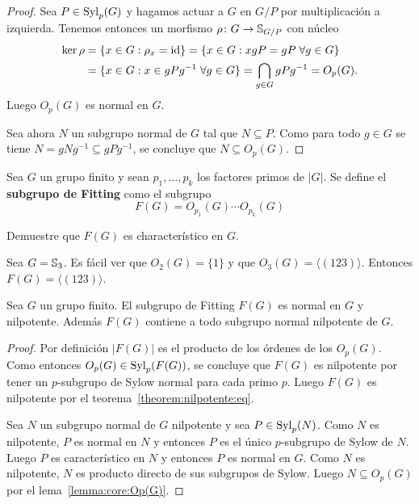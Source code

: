 \begin{proof}
	Sea $P\in\mathrm{Syl}_p(G)$ y hagamos actuar a $G$ en $G/P$ por multiplicación a
	izquierda. Tenemos entonces un morfismo $\rho\colon G\to\mathbb{S}_{G/P}$ con
	núcleo
	\begin{align*}
		\ker\rho&=\{x\in G:\rho_x=\operatorname{id}\}
		=\{x\in G:xgP=gP\;\forall g\in G\}\\
		&=\{x\in G:x\in gPg^{-1}\;\forall g\in G\}=\bigcap_{g\in G}gPg^{-1}=O_p(G).
	\end{align*}
	Luego $O_p(G)$ es normal en $G$.

	Sea ahora $N$ un subgrupo normal de $G$ tal que $N\subseteq P$. Como para
	todo $g\in G$ se tiene $N=gNg^{-1}\subseteq gPg^{-1}$, se concluye que
	$N\subseteq O_p(G)$.
\end{proof}

\begin{definition}
	Sea $G$ un grupo finito y sean $p_1,\dots,p_k$ los factores primos de
	$|G|$.  Se define el \textbf{subgrupo de Fitting} como el subgrupo
	\[
		F(G)=O_{p_1}(G)\cdots O_{p_k}(G)
	\]
\end{definition}

\begin{exercise}
	Demuestre que $F(G)$ es characterístico en $G$.
\end{exercise}



\begin{example}
	Sea $G=\mathbb{S}_3$. Es fácil ver que $O_2(G)=\{1\}$ y que $O_3(G)=\langle
	(123)\rangle$. Entonces $F(G)=\langle (123)\rangle$.
\end{example}

\begin{theorem}[Fitting]
	\label{theorem:Fitting}
	Sea $G$ un grupo finito. El subgrupo de Fitting $F(G)$ es normal en $G$ y
	nilpotente. Además $F(G)$ contiene a todo subgrupo normal nilpotente de
	$G$.
\end{theorem}

\begin{proof}
	Por definición $|F(G)|$ es el producto de los órdenes de los $O_p(G)$.
	Como entonces $O_p(G)\in\mathrm{Syl}_p(F(G))$,  se concluye que $F(G)$ es
	nilpotente por tener un $p$-subgrupo de Sylow normal para cada primo $p$.
	Luego $F(G)$ es nilpotente por el teorema~\ref{theorem:nilpotente:eq}.

	Sea $N$ un subgrupo normal de $G$ nilpotente y sea $P\in\mathrm{Syl}_p(N)$. Como
	$N$ es nilpotente, $P$ es normal en $N$ y entonces $P$ es el único
	$p$-subgrupo de Sylow de $N$. Luego $P$ es característico en $N$ y entonces
	$P$ es normal en $G$. Como $N$ es nilpotente, $N$ es producto directo de
	sus subgrupos de Sylow. Luego $N\subseteq O_p(G)$ por el
	lema~\ref{lemma:core:Op(G)}.
\end{proof}

